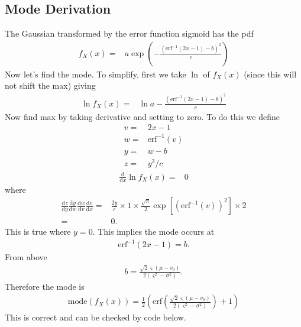 \documentclass{article}
\begin{document}
{\subsection*{Mode Derivation}
The Gaussian transformed by the error function sigmoid has the pdf
\begin{align}
	f_X(x)=& a\exp\left(-\frac{ \left(\mathrm{erf}^{-1}\left(2x-1\right) - b\right)^2}{c}\right)
\end{align}
Now let's find the mode. To simplify, first we take $\ln$ of $f_X(x)$ (since this will not shift the max) giving
\begin{align}
	\ln f_X(x)=& \ln a - \frac{ (\mathrm{erf}^{-1}\left(2x-1\right) - b)^2}{c}
\end{align}
Now find max by taking derivative and setting to zero. To do this we define
\begin{align}
	v =& 2x-1 \nonumber \\
	w =& \mathrm{erf}^{-1}(v) \nonumber \\
	y =& w-b \nonumber \\
	z =& y^2/c \nonumber
\end{align}
\begin{align}
	\frac{\mathrm{d}}{\mathrm{d}x} \ln f_X(x) =& 0
\end{align}
where
\begin{align}
	\frac{\mathrm{d}z}{\mathrm{d}y} \frac{\mathrm{d}y}{\mathrm{d}w} \frac{\mathrm{d}w}{\mathrm{d}v} \frac{\mathrm{d}v}{\mathrm{d}x} =& \frac{2y}{c} \times 1 \times \frac{\sqrt{\pi}}{2}\exp\left[\left(\mathrm{erf}^{-1}(v)\right)^2\right] \times 2 \\
	=& 0.
\end{align}
This is true where $y=0$. This implies the mode occurs at
\begin{align}
	\mathrm{erf}^{-1}(2x-1) = b.
\end{align}
From above
\begin{align}
	b = \frac{\sqrt{2}\varsigma\left(\mu-v_0\right)}{2\left(\varsigma^2-\sigma^2\right)}.
\end{align}
Therefore the mode is
\begin{align}
	\mathrm{mode}\left(f_X(x)\right) = \frac{1}{2}\left(\mathrm{erf}\left(\frac{\sqrt{2}\varsigma\left(\mu-v_0\right)}{2\left(\varsigma^2 - \sigma^2\right)}\right)+1\right)
\end{align}
This is correct and can be checked by code below.
}
\small


\end{document}
